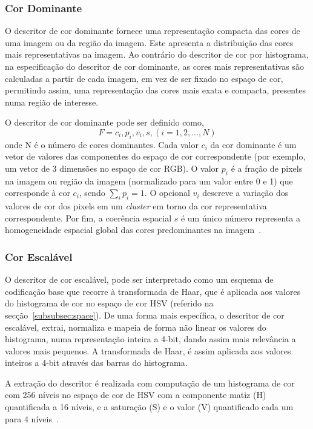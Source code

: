 \subsubsection{Cor Dominante}

O descritor de cor dominante fornece uma representação compacta das cores de uma imagem ou da região da imagem. Este apresenta a distribuição das cores mais representativas na imagem. Ao contrário do descritor de cor por histograma, na especificação do descritor de cor dominante, as cores mais representativas são calculadas a partir de cada imagem, em vez de ser fixado no espaço de cor, permitindo assim, uma representação das cores mais exata e compacta, presentes numa região de interesse.

O descritor de cor dominante pode ser definido como,
\[ F = {{c_{i}, p_{i}, v_{i}},s}, (i=1,2,...,N) \]
onde N é o número de cores dominantes. Cada valor $ c_{i} $ da cor dominante é um vetor de valores das componentes do espaço de cor correspondente (por exemplo, um vetor de 3 dimensões no espaço de cor RGB). O valor $ p_{i} $ é a fração de pixels na imagem ou região da imagem (normalizado para um valor entre 0 e 1) que corresponde à cor $ c_{i} $, sendo $  \sum_i p_{i} = 1 $. O opcional $ v_{i} $ descreve a variação dos valores de cor dos pixels em um \textit{cluster} em torno da cor representativa correspondente. Por fim, a coerência espacial $ s $ é um único número  representa a homogeneidade espacial global das cores predominantes na imagem~\cite{Ite-vil}.

\subsubsection{Cor Escalável}

O descritor de cor escalável, pode ser interpretado como um esquema de codificação base que recorre à transformada de Haar, que é aplicada aos valores do histograma de cor no espaço de cor HSV (referido na secção~\ref{subsubsec:space}). De uma forma mais específica, o descritor de cor escalável, extrai, normaliza e mapeia de forma não linear os valores do histograma, numa representação inteira a 4-bit, dando assim mais relevância a valores mais pequenos. A transformada de Haar, é assim aplicada aos valores inteiros a 4-bit através das barras do histograma. 

A extração do descritor é realizada com computação de um histograma de cor com 256 níveis no espaço de cor de HSV com a componente matiz (H) quantificada a 16 níveis, e a saturação (S) e o valor (V) quantificado cada um para 4 níveis~\cite{Christopoulos2000}. 


